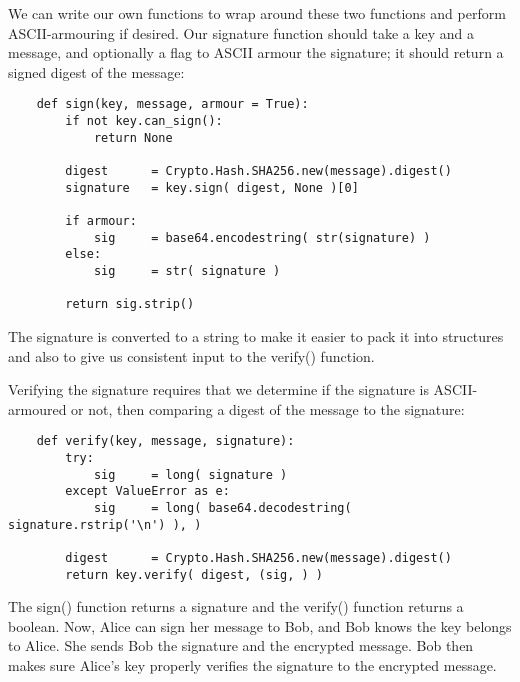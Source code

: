 \documentclass[letterpaper,10pt]{article}
\begin{document}
We can write our own functions to wrap around these two functions and perform 
ASCII-armouring if desired. Our signature function should take a key and a 
message, and optionally a flag to ASCII armour the signature; it should return a
signed digest of the message:
\begin{verbatim}
    def sign(key, message, armour = True):
        if not key.can_sign(): 
            return None

        digest      = Crypto.Hash.SHA256.new(message).digest()
        signature   = key.sign( digest, None )[0]

        if armour:
            sig     = base64.encodestring( str(signature) )
        else:
            sig     = str( signature )
    
        return sig.strip()
\end{verbatim}

The signature is converted to a string to make it easier to pack it into 
structures and also to give us consistent input to the verify() function.

Verifying the signature requires that we determine if the signature is
ASCII-armoured or not, then comparing a digest of the message to the signature:
\begin{verbatim}
    def verify(key, message, signature):
        try:
            sig     = long( signature )
        except ValueError as e:
            sig     = long( base64.decodestring( signature.rstrip('\n') ), )

        digest      = Crypto.Hash.SHA256.new(message).digest()
        return key.verify( digest, (sig, ) )
\end{verbatim}

The sign() function returns a signature and the verify() function returns a 
boolean. Now, Alice can sign her message to Bob, and Bob knows the key belongs
to Alice. She sends Bob the signature and the encrypted message. Bob then makes
sure Alice's key properly verifies the signature to the encrypted message.
\end{document}
